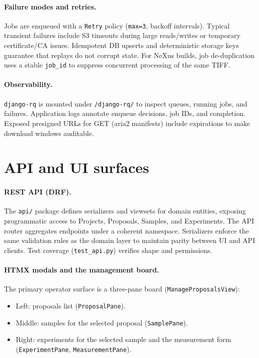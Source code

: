 \paragraph{Failure modes and retries.}
Jobs are enqueued with a \texttt{Retry} policy (\texttt{max=3}, backoff intervals). Typical transient failures include S3 timeouts during large reads/writes or temporary certificate/CA issues. Idempotent DB upserts and deterministic storage keys guarantee that replays do not corrupt state. For NeXus builds, job de-duplication uses a stable \texttt{job\_id} to suppress concurrent processing of the same TIFF.

\paragraph{Observability.}
\texttt{django-rq} is mounted under \texttt{/django-rq/} to inspect queues, running jobs, and failures. Application logs annotate enqueue decisions, job IDs, and completion. Exposed presigned URLs for GET (aria2 manifests) include expirations to make download windows auditable.

\section{API and UI surfaces}\label{sec:api-ui}

\paragraph{REST API (DRF).}
The \texttt{api/} package defines serializers and viewsets for domain entities, exposing programmatic access to Projects, Proposals, Samples, and Experiments. The API router aggregates endpoints under a coherent namespace. Serializers enforce the same validation rules as the domain layer to maintain parity between UI and API clients. Test coverage (\texttt{test\_api.py}) verifies shape and permissions.

\paragraph{HTMX modals and the management board.}
The primary operator surface is a three-pane board (\texttt{ManageProposalsView}):

\begin{itemize}
	\item Left: proposals list (\texttt{ProposalPane}).
	\item Middle: samples for the selected proposal (\texttt{SamplePane}).
	\item Right: experiments for the selected sample and the measurement form (\texttt{ExperimentPane}, \texttt{MeasurementPane}).
\end{itemize}

